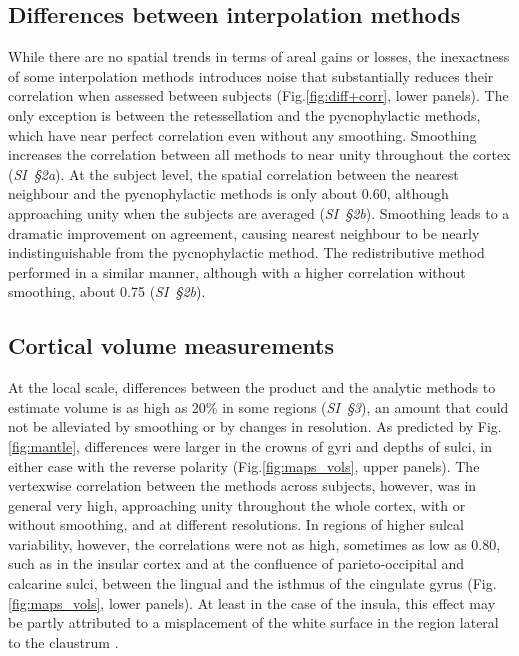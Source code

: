 \subsection{Differences between interpolation methods}

While there are no spatial trends in terms of areal gains or losses, the inexactness of some interpolation methods introduces noise that substantially reduces their correlation when assessed between subjects (Fig.\ref{fig:diff+corr}, lower panels). The only exception is between the retessellation and the pycnophylactic methods, which have near perfect correlation even without any smoothing. Smoothing increases the correlation between all methods to near unity throughout the cortex (\emph{SI~§2a}). At the subject level, the spatial correlation between the nearest neighbour and the pycnophylactic methods is only about 0.60, although approaching unity when the subjects are averaged (\emph{SI~§2b}). Smoothing leads to a dramatic improvement on agreement, causing nearest neighbour to be nearly indistinguishable from the pycnophylactic method. The redistributive method performed in a similar manner, although with a higher correlation without smoothing, about 0.75 (\emph{SI~§2b}).

\subsection{Cortical volume measurements}

At the local scale, differences between the product and the analytic methods to estimate volume is as high as 20\% in some regions (\emph{SI~§3}), an amount that could not be alleviated by smoothing or by changes in resolution. As predicted by Fig.\ref{fig:mantle}, differences were larger in the crowns of gyri and depths of sulci, in either case with the reverse polarity (Fig.\ref{fig:maps_vols}, upper panels). The vertexwise correlation between the methods across subjects, however, was in general very high, approaching unity throughout the whole cortex, with or without smoothing, and at different resolutions. In regions of higher sulcal variability, however, the correlations were not as high, sometimes as low as 0.80, such as in the insular cortex and at the confluence of parieto-occipital and calcarine sulci, between the lingual and the isthmus of the cingulate gyrus (Fig.\ref{fig:maps_vols}, lower panels). At least in the case of the insula, this effect may be partly attributed to a misplacement of the white surface in the region lateral to the claustrum \citep{Glasser2016}.

